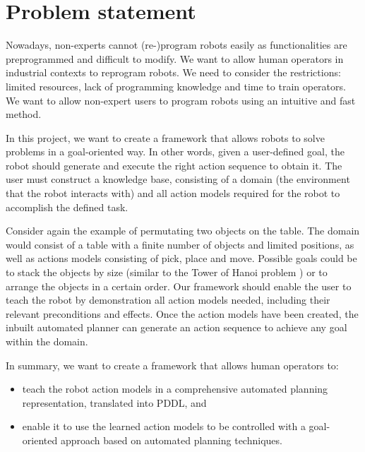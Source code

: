 \section{Problem statement}
Nowadays, non-experts cannot (re-)program robots easily as functionalities are preprogrammed and difficult to modify. We want to allow human operators in industrial contexts to reprogram robots. We need to consider the restrictions: limited resources, lack of programming knowledge and time to train operators. We want to allow non-expert users to program robots using an intuitive and fast method.

In this project, we want to create a framework that allows robots to solve problems in a goal-oriented way. In other words, given a user-defined goal, the robot should generate and execute the right action sequence to obtain it. The user must construct a knowledge base, consisting of a domain (the environment that the robot interacts with) and all action models required for the robot to accomplish the defined task. 

Consider again the example of permutating two objects on the table. The domain would consist of a table with a finite number of objects and limited positions, as well as actions models consisting of pick, place and move. Possible goals could be to stack the objects by size (similar to the Tower of Hanoi problem \cite{douglas1985metamagical}) or to arrange the objects in a certain order. Our framework should enable the user to teach the robot by demonstration all action models needed, including their relevant preconditions and effects. Once the action models have been created, the inbuilt automated planner can generate an action sequence to achieve any goal within the domain. 


\noindent In summary, we want to create a framework that allows human operators to:

\begin{itemize}
\item teach the robot action models in a comprehensive automated planning representation, translated into PDDL, and
\item enable it to use the learned action models to be controlled with a goal-oriented approach based on automated planning techniques.
\end{itemize}

